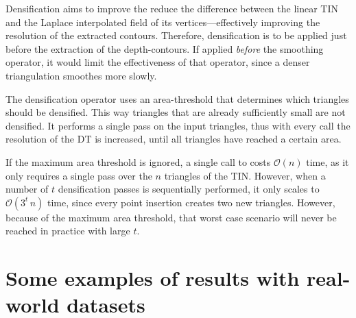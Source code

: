 %

Densification aims to improve the reduce the difference between the linear TIN and the Laplace interpolated field of its vertices---effectively improving the resolution of the extracted contours.
Therefore, densification is to be applied just before the extraction of the depth-contours.
If applied \emph{before} the smoothing operator, it would limit the effectiveness of that operator, since a denser triangulation smoothes more slowly.

The densification operator uses an area-threshold that determines which triangles should be densified. 
This way triangles that are already sufficiently small are not densified. 
It performs a single pass on the input triangles, thus with every call the resolution of the DT is increased, until all triangles have reached a certain area.

If the maximum area threshold is ignored, a single call to costs $\mathcal{O}(n)$ time, as it only requires a single pass over the $n$ triangles of the TIN\@. 
However, when a number of $t$ densification passes is sequentially performed, it only scales to $\mathcal{O}(3^t \, n)$ time, since every point insertion creates two new triangles. 
However, because of the maximum area threshold, that worst case scenario will never be reached in practice with large $t$.


%
\section{Some examples of results with real-world datasets}



